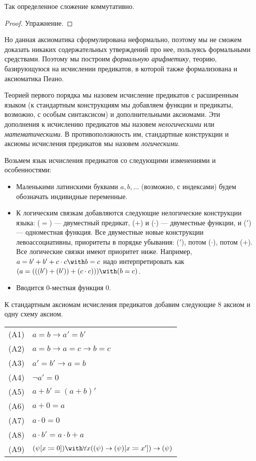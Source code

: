 \begin{theorem}Так определенное сложение коммутативно.
\end{theorem}
\begin{proof}Упражнение.\end{proof}

Но данная аксиоматика сформулирована неформально, поэтому мы не сможем
доказать никаких содержательных утверждений про нее, пользуясь формальными
средствами. Поэтому мы построим \emph{формальную арифметику}, теорию,
базирующуюся на исчислении предикатов, в которой также формализована и
аксиоматика Пеано.

\begin{definition}Теорией первого порядка мы назовем исчисление предикатов
с расширенным языком (к стандартным конструкциям мы добавляем функции и 
предикаты, возможно, с особым синтаксисом) и дополнительными аксиомами. 
Эти дополнения к исчислению предикатов мы назовем \emph{нелогическими} или 
\emph{математическими}. В противоположность им, стандартные конструкции и 
аксиомы исчисления предикатов мы назовем \emph{логическими}.
\end{definition}

Возьмем язык исчисления предикатов со следующими изменениями и особенностями:

\begin{itemize}
\item Маленькими латинскими буквами $a,b,\dots$ (возможно, с индексами) будем 
обозначать индивидные переменные. 
\item К логическим связкам добавляются следующие нелогические конструкции языка: 
($=$) --- двуместный предикат, ($+$) и ($\cdot$) --- двуместные функции, и 
($'$) --- одноместная функция. Все двуместные новые конструкции левоассоциативны, 
приоритеты в порядке убывания: ($'$), потом ($\cdot$), потом ($+$). 
Все логические связки имеют приоритет ниже. Например, $a= b'+b'+c \cdot c \with b = c$ 
надо интерпретировать как $(a = (((b') + (b')) + (c \cdot c))) \with (b = c)$.
\item Вводится 0-местная функция $0$.
\end{itemize}

К стандартным аксиомам исчисления предикатов добавим следующие 8 аксиом и одну схему аксиом.

\begin{tabular}{ll}
(A1) & $a = b \rightarrow a' = b'$\\
(A2) & $a = b \rightarrow a = c \rightarrow b = c$\\
(A3) & $a' = b' \rightarrow a = b$\\
(A4) & $\neg a' = 0$\\
(A5) & $a + b' = (a+b)'$\\
(A6) & $a + 0 = a$\\
(A7) & $a \cdot 0 = 0$\\
(A8) & $a \cdot b' = a \cdot b + a$\\
(A9) & $(\psi [x \coloneqq  0]) \with \forall{x}((\psi) \rightarrow (\psi) [x \coloneqq  x']) \rightarrow (\psi)$
\end{tabular}

